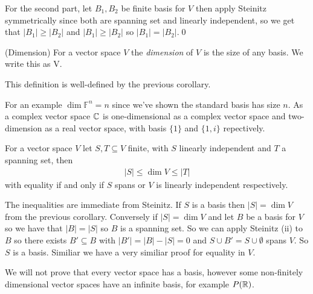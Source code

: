 \documentclass{article}
\newcommand{\F}{\mathbb{F}}
\begin{document}
For the second part, let $ B_1,B_2 $ be finite basis for $ V $ then apply Steinitz symmetrically since both are spanning set and linearly independent, so we get that $ |B_1|\ge |B_2| $ and $ |B_1|\ge |B_2| $ so $ |B_1|=|B_2| $.\qed
\begin{definition}
	(Dimension) For a vector space $ V $ the \textit{dimension} of $ V $ is the size of any basis. We write this as \dim V.
\end{definition}
This definition is well-defined by the previous corollary.\par
For an example $ \dim \F^n=n $ since we've shown the standard basis has size $ n $. As a complex vector space $ \mathbb{C} $ is one-dimensional as a complex vector space and two-dimension as a real vector space, with basis $ \{1\} $ and $ \{1,i\} $ repectively.
\begin{corollary}
  For a vector space $ V $ let $ S,T\subseteq V $ finite, with $ S $ linearly independent and $ T $ a spanning set, then
  \begin{align*}
	  |S|\le \dim V\le |T|
	  \end{align*}
	  with equality if and only if $ S $ spans or $ V $ is linearly independent respectively.
\end{corollary}
\pf The inequalities are immediate from Steinitz. If $ S $ is a basis then $ |S|=\dim V $ from the previous corollary. Conversely if $ |S|=\dim V $ and let $ B $ be a basis for $ V $ so we have that $ |B|=|S| $ so $ B $ is a spanning set. So we can apply Steinitz (ii) to $ B $ so there exists $ B'\subseteq B $ with $ |B'|=|B|-|S|=0 $ and $ S\cup B'=S\cup \emptyset $ spans $ V $. So $ S $ is a basis. Similiar we have a very similiar proof for equality in $ V $.\par We will not prove that every vector space has a basis, however some non-finitely dimensional vector spaces have an infinite basis, for example $ P(\mathbb{R}) $.
\end{document}
